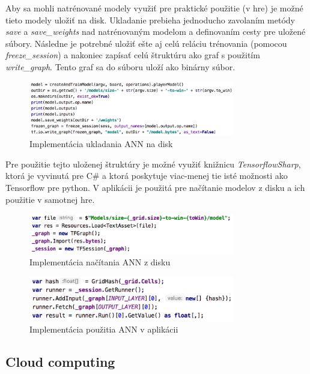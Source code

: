 Aby sa mohli natrénované modely využiť pre praktické použitie (v hre) je možné tieto modely uložiť na disk.
Ukladanie prebieha jednoducho zavolaním metódy \emph{save} a \emph{save\_weights} nad natrénovaným modelom a definovaním
cesty pre uložené súbory.
Následne je potrebné uložiť ešte aj celú reláciu trénovania (pomocou \emph{freeze\_session}) a nakoniec zapísať celú
štruktúru ako graf s použitím \emph{write\_graph}.
Tento graf sa do súboru uloží ako binárny súbor.
\begin{figure}[H]
    \centering
    \includegraphics[width=0.8\textwidth]{images/impl-ann-save.png}
    \caption{Implementácia ukladania ANN na disk}
\end{figure}\label{figure:ann-save-impl}
Pre použitie tejto uloženej štruktúry je možné využiť knižnicu \emph{TensorflowSharp}, ktorá je vyvinutá pre C\# a ktorá
poskytuje viac-menej tie isté možnosti ako Tensorflow pre python.
V aplikácii je použitá pre načítanie modelov z disku a ich použitie v samotnej hre.
\begin{figure}[H]
    \centering
    \includegraphics[width=0.8\textwidth]{images/impl-ann-load.png}
    \caption{Implementácia načítania ANN z disku}
\end{figure}\label{figure:ann-load-impl}
\begin{figure}[H]
    \centering
    \includegraphics[width=0.8\textwidth]{images/impl-ann-usage.png}
    \caption{Implementácia použitia ANN v aplikácii}
\end{figure}\label{figure:ann-usage-impl}

\subsection{Cloud computing}\label{subsec:ci}

